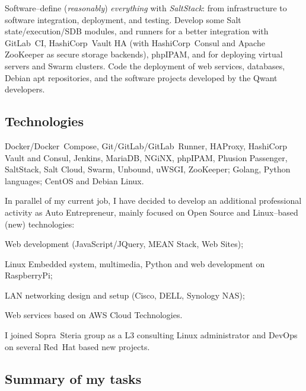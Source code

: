 \vskip 0pt\noindent
Software--define ({\it reasonably}\/) {\it everything\/} with {\it SaltStack\/}:
from infrastructure to software integration, deployment, and testing.
Develop some Salt state/execution/SDB modules, and runners for a better
integration with GitLab~CI, HashiCorp~Vault HA (with HashiCorp~Consul and
Apache ZooKeeper as secure storage backends), phpIPAM, and for deploying
virtual servers and Swarm clusters.
Code the deployment of web services, databases, Debian apt repositories, and the
software projects developed by the Qwant developers.

\subsection{Technologies}

\vskip 0pt\noindent
Docker/Docker~Compose, Git/GitLab/GitLab~Runner, HAProxy,
HashiCorp Vault and Consul, Jenkins, MariaDB, NGiNX, phpIPAM,
Phusion Passenger, SaltStack, Salt Cloud, Swarm, Unbound, uWSGI, ZooKeeper;
Golang, Python languages; CentOS and Debian Linux.



In parallel of my current job, I have decided to develop an additional professional
activity as Auto Entrepreneur, mainly focused on Open Source and Linux--based (new) technologies:

\item{\bdot} Web development (JavaScript/JQuery, MEAN Stack, Web Sites);
\item{\bdot} Linux Embedded system, multimedia, Python and web development on RaspberryPi;
\item{\bdot} LAN networking design and setup (Cisco, DELL, Synology NAS);
\item{\bdot} Web services based on AWS Cloud Technologies.



I joined Sopra~Steria group as a L3 consulting Linux administrator and DevOps on
several Red~Hat based new projects.

\subsection{Summary of my tasks}


